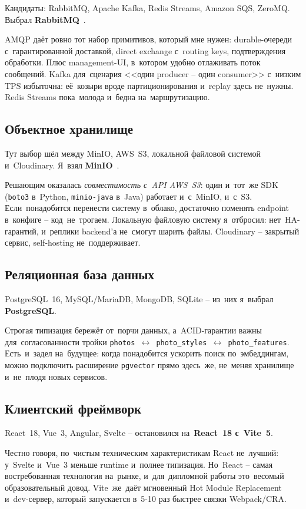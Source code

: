 \documentclass[a4paper,12pt]{diplom}
\begin{document}
Кандидаты: RabbitMQ, Apache Kafka, Redis Streams, Amazon SQS, ZeroMQ. Выбрал \textbf{RabbitMQ}~\cite{RabbitMQDocs}.

AMQP даёт ровно тот набор примитивов, который мне нужен: durable-очереди с~гарантированной доставкой, direct exchange с~routing keys, подтверждения обработки. Плюс management-UI, в~котором удобно отлаживать поток сообщений. Kafka для~сценария <<один producer -- один consumer>> с~низким TPS избыточна: её~козыри вроде партиционирования и~replay здесь не~нужны. Redis Streams пока~молода и~бедна на~маршрутизацию.

\subsection{Объектное хранилище}

Тут выбор шёл между MinIO, AWS~S3, локальной файловой системой и~Cloudinary. Я~взял \textbf{MinIO}~\cite{MinIODocs}.

Решающим оказалась \emph{совместимость с~API AWS~S3}: один и~тот~же SDK (\texttt{boto3} в~Python, \texttt{minio-java} в~Java) работает и~с~MinIO, и~с~S3. Если~понадобится перенести систему в~облако, достаточно поменять endpoint в~конфиге -- код~не~трогаем. Локальную файловую систему я~отбросил: нет~HA-гарантий, и~реплики backend'а не~смогут шарить файлы. Cloudinary -- закрытый сервис, self-hosting не~поддерживает.

\subsection{Реляционная база данных}

PostgreSQL~16, MySQL/MariaDB, MongoDB, SQLite -- из~них я~выбрал \textbf{PostgreSQL}.

Строгая типизация бережёт от~порчи данных, а~ACID-гарантии важны для~согласованности тройки \texttt{photos $\leftrightarrow$ photo\_styles $\leftrightarrow$ photo\_features}. Есть~и~задел на~будущее: когда понадобится ускорить поиск по~эмбеддингам, можно подключить расширение \texttt{pgvector} прямо здесь~же, не~меняя хранилище и~не~плодя новых сервисов.

\subsection{Клиентский фреймворк}

React~18, Vue~3, Angular, Svelte -- остановился на~\textbf{React~18 с~Vite~5}.

Честно говоря, по~чистым техническим характеристикам React не~лучший: у~Svelte и~Vue~3 меньше runtime и~полнее типизация. Но~React -- самая востребованная технология на~рынке, и~для~дипломной работы это~весомый образовательный довод. Vite~же~даёт мгновенный Hot Module Replacement и~dev-сервер, который запускается в~5-10 раз быстрее связки Webpack/CRA.
\end{document}
